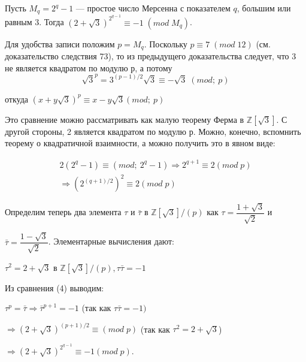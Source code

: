  	 \begin{sled}
 	 \noindent
 	 
 	 Пусть $M_q = 2^q - 1$ — простое число Мерсенна с показателем $q$, большим или равным 3. Тогда $(2+\sqrt{3})^{2^{q-1}} \equiv -1 \; (mod\;M_q)$.
 	 \end{sled}
 	 \begin{myproof}
 	 \noindent
 	 
 	 
 	 	
 	 	Для удобства записи положим $p = M_q$. Поскольку $p \equiv 7 \; (mod\;12)$ (см. доказательство следствия 73), то из предыдущего доказательства следует, что 3 не является квадратом по модулю $р$, а потому 
 	 	\begin{equation}
 	 	\sqrt{3}^p = 3^{(p-1)/2}\sqrt{3}\equiv -\sqrt{3} \;(mod;\ p)
 	 	\end{equation}
 	 	
 	 	\begin{center}
 	 		откуда $(x+y\sqrt{3})^p \equiv x- y\sqrt{3} (mod;\ p)$
 	 	\end{center}
  	    Это сравнение можно рассматривать как малую теорему Ферма в $\mathbb Z[\sqrt{3}]$. С другой стороны, 2 является квадратом по модулю $р$. Можно, конечно, вспомнить теорему о квадратичной взаимности, а можно получить это в явном виде:

 	 	\begin{equation}
 	 		\begin{split}
 	 			2(2^q-1) \equiv (mod ;\ 2^q-1)  \Rightarrow 2^{q+1} \equiv 2 (mod \; p) \\ 	
 	 			 \Rightarrow (2^{(q+1)/2})^2 \equiv 2 (mod \; p)
 	 		\end{split}
 	 	\end{equation}

 	 	Определим теперь два элемента $\tau$ и $\bar{\tau}$ в $\mathbb Z[\sqrt{3}]/(p)$ как $\tau = \dfrac{1+\sqrt{3}}{\sqrt{2}}$ и
 	 
 	 
 	 \pagebreak 
  	 
  	 
  	 	$\bar\tau = \dfrac{1-\sqrt{3}}{\sqrt{2}}$. Элементарные вычисления дают:
		\begin{center}
			$\tau^2 = 2 +\sqrt{3}$ в $\mathbb Z[\sqrt{3}]/(p), \tau\bar{\tau}=-1$
		\end{center}
		
		Из сравнения (4) выводим:
		
		$\tau^p=\bar{\tau}\Rightarrow\bar{\tau}^{p+1}=-1$ (так как $\tau\bar{\tau}=-1)$ \begin{center}
			$\Rightarrow (2+\sqrt{3})^{(p+1)/2} \equiv (mod\;p)$ (так как $\tau^2 = 2+\sqrt{3}$)
		\end{center} 
		\begin{center}
		$\Rightarrow (2+\sqrt{3})^{2^{q-1}} \equiv -1 (mod\;p)$.
		\end{center} 

  	 \end{myproof}	
   
